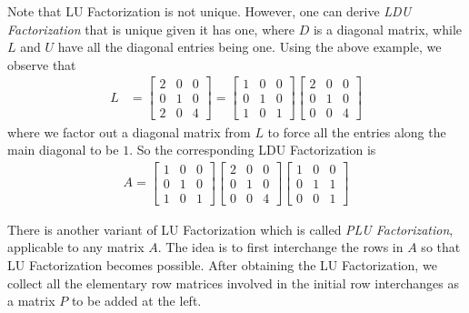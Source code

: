 Note that LU Factorization is not unique. However, one can derive \textit{LDU Factorization} that is unique given it has one, where $D$ is a diagonal matrix, while $L$ and $U$ have all the diagonal entries being one. Using the above example, we observe that
\begin{align*}
L &=
\begin{bmatrix}
2 & 0 & 0 \\
0 & 1 & 0 \\
2 & 0 & 4
\end{bmatrix} = 
\begin{bmatrix}
1 & 0 & 0 \\
0 & 1 & 0 \\
1 & 0 & 1
\end{bmatrix}
\begin{bmatrix}
2 & 0 & 0 \\
0 & 1 & 0 \\
0 & 0 & 4
\end{bmatrix}
\end{align*}
where we factor out a diagonal matrix from $L$ to force all the entries along the main diagonal to be $1$. So the corresponding LDU Factorization is
\begin{align*}
A =
\begin{bmatrix}
1 & 0 & 0 \\
0 & 1 & 0 \\
1 & 0 & 1
\end{bmatrix}
\begin{bmatrix}
2 & 0 & 0 \\
0 & 1 & 0 \\
0 & 0 & 4
\end{bmatrix}
\begin{bmatrix}
1 & 0 & 0 \\
0 & 1 & 1 \\
0 & 0 & 1 
\end{bmatrix}
\end{align*}

There is another variant of LU Factorization which is called \textit{PLU Factorization}, applicable to any matrix $A$. The idea is to first interchange the rows in $A$ so that LU Factorization becomes possible. After obtaining the LU Factorization, we collect all the elementary row matrices involved in the initial row interchanges as a matrix $P$ to be added at the left.

